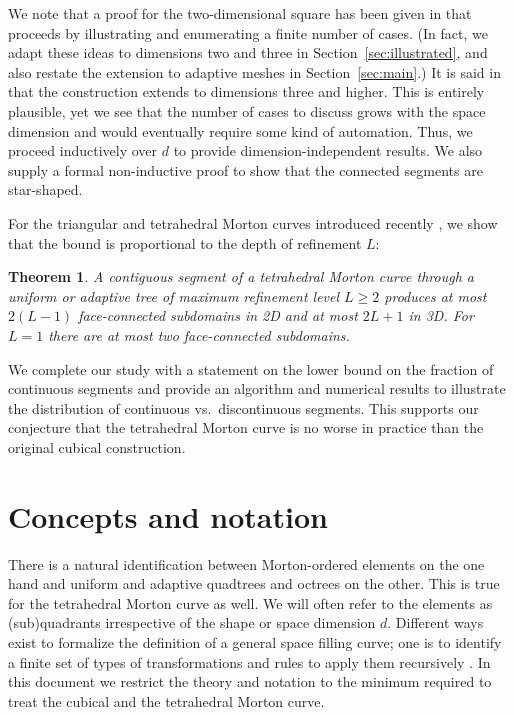 \documentclass[a4paper,11pt]{article}
\newcommand{\seclab}[1]{\label{sec:#1}}
\newcommand{\secref}[1]{Section~\ref{sec:#1}}
\newtheorem{thm}{Theorem}
\begin{document}
We note that a proof for the two-dimensional square has been given in
\cite[pages 175--177]{Bader12} that proceeds by illustrating and enumerating a
finite number of cases.
(In fact, we adapt these ideas to dimensions two and three in
\secref{illustrated}, and also restate the extension to adaptive meshes in
\secref{main}.)
It is said in \cite{Bader12} that the construction extends to dimensions three
and higher.
This is entirely plausible, yet we see that the number of cases to discuss
grows with the space dimension and would eventually require some kind of
automation.
Thus, we proceed inductively over $d$ to provide dimension-independent
results.
We also supply a formal non-inductive proof to show that the
connected segments are star-shaped.

For the triangular and tetrahedral Morton curves introduced recently
\cite{BursteddeHolke16}, we show that the bound is proportional to the depth of
refinement $L$:
\begin{thm}
  \label{illthmalltets}
  A contiguous segment of a tetrahedral Morton curve through a uniform or
  adaptive tree of maximum refinement level $L\geq 2$ produces at most $2(L-1)$
  face-connected subdomains in 2D and at most $2L+1$ in 3D.
  For $L=1$ there are at most two face-connected subdomains.
\end{thm}

We complete our study with a statement on the lower bound on the fraction of
continuous segments and provide an algorithm and numerical results to
illustrate the distribution of continuous vs.\ discontinuous segments.
This supports our conjecture that the tetrahedral Morton curve is no worse in
practice than the original cubical construction.





\section{Concepts and notation}
\seclab{concepts}

There is a natural identification between Morton-ordered elements on the one
hand and uniform and adaptive quadtrees \cite{FinkelBentley74} and octrees
\cite{Meagher82} on the other.
This is true for the tetrahedral Morton curve \cite{BursteddeHolke16} as well.
We will often refer to the elements as (sub)quadrants irrespective of the shape
or space dimension $d$.
Different ways exist to formalize the definition of a general space filling
curve; one is to identify a finite set of types of transformations and rules to
apply them recursively \cite{HaverkortWalderveen10}.
In this document we restrict the theory and notation to the minimum required to
treat the cubical and the tetrahedral Morton curve.
\end{document}
